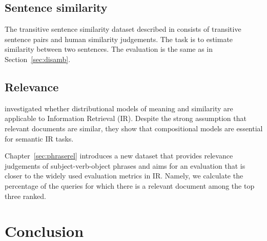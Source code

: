 \subsection{Sentence similarity}
\label{sec:sentence-similarity}

The transitive sentence similarity dataset described in  consists of transitive sentence pairs and human similarity judgements. The task is to estimate similarity between two sentences. The evaluation is the same as in Section~\ref{sec:disamb}.

\subsection{Relevance}
\label{sec:relevance}

 investigated whether distributional
models of meaning and similarity are applicable to Information Retrieval (IR). Despite the strong assumption that relevant documents are similar, they show that compositional models are essential for semantic IR tasks.

Chapter~\ref{sec:phraserel} introduces a new dataset that provides relevance judgements of subject-verb-object phrases and aims for an evaluation that is closer to the widely used evaluation metrics in IR. Namely, we calculate the percentage of the queries for which there is a relevant document among the top three ranked.

\section{Conclusion}
\label{sec:conclusion-comp}



